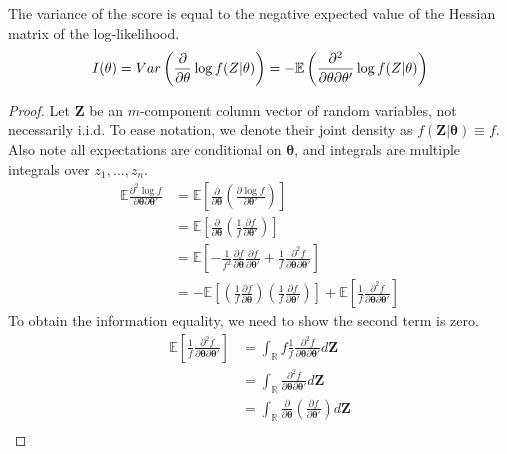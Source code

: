\documentclass[DIV=14,titlepage=false]{scrreprt}
\begin{document}
\begin{lemma}
    The variance of the score is equal to the negative expected value of the Hessian matrix of the log-likelihood.
    \[ I(\theta)=Var\left(\frac{\partial}{\partial \theta}\log f(Z|\theta)\right)=-\mathbb{E}\left(\frac{\partial^2}{\partial \theta \partial \theta'}\log f(Z|\theta)\right)\]
\end{lemma}

\begin{proof}
    Let $\boldsymbol{Z}$ be an $m$-component column vector of random variables, not necessarily i.i.d. To ease notation, we denote their joint density as $f(\boldsymbol{Z}|\boldsymbol{\theta})\equiv f$. Also note all expectations are conditional on $\boldsymbol{\theta}$, and integrals are multiple integrals over $z_1, \dots, z_n$.
    \begin{align*}
        \mathbb{E} \frac{\partial^2 \log f}{\partial \boldsymbol{\theta} \partial \boldsymbol{\theta}'} &= \mathbb{E} \left[ \frac{\partial}{\partial \boldsymbol{\theta}}\left( \frac{\partial \log f}{\partial \boldsymbol{\theta}'}\right)\right]\\
        &= \mathbb{E} \left[ \frac{\partial}{\partial \boldsymbol{\theta}}\left( \frac{1}{f}\frac{\partial f}{\partial \boldsymbol{\theta}'}\right)\right]\\
        &= \mathbb{E}\left[-\frac{1}{f^2}\frac{\partial f}{\partial \boldsymbol{\theta}}\frac{\partial f}{\partial \boldsymbol{\theta}'}+\frac{1}{f}\frac{\partial^2f}{\partial \boldsymbol{\theta} \partial \boldsymbol{\theta}'}\right]\\
        &= -\mathbb{E}\left[\left(\frac{1}{f}\frac{\partial f}{\partial \boldsymbol{\theta}}\right)\left(\frac{1}{f}\frac{\partial f}{\partial \boldsymbol{\theta}'}\right)\right] + \mathbb{E}\left[\frac{1}{f}\frac{\partial^2f}{\partial \boldsymbol{\theta} \partial \boldsymbol{\theta}'}\right]
    \end{align*}
To obtain the information equality, we need to show the second term is zero.
\begin{align*}
    \mathbb{E}\left[\frac{1}{f}\frac{\partial^2f}{\partial \boldsymbol{\theta} \partial \boldsymbol{\theta}'}\right] &= \int_{\mathbb{R}} f \frac{1}{f}\frac{\partial^2f}{\partial \boldsymbol{\theta} \partial \boldsymbol{\theta}'} d\boldsymbol{Z}\\
    &= \int_{\mathbb{R}}\frac{\partial^2f}{\partial \boldsymbol{\theta} \partial \boldsymbol{\theta}'} d\boldsymbol{Z}\\
    &= \int_{\mathbb{R}}\frac{\partial}{\partial \boldsymbol{\theta}}\left(\frac{\partial f}{\partial \boldsymbol{\theta}'}\right) d\boldsymbol{Z}\\

\end{align*}
\end{proof}
\end{document}
